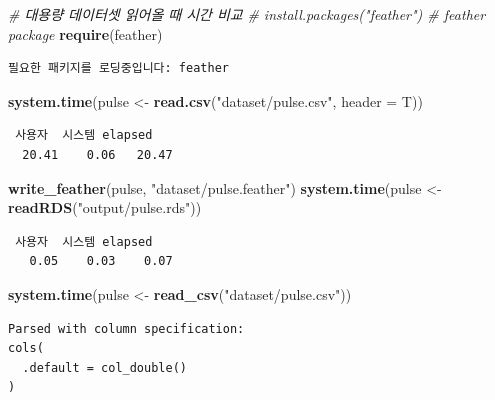 \documentclass[
  11pt,
]{krantz}
\newenvironment{Shaded}{\begin{snugshade}}{\end{snugshade}}
\newcommand{\CommentTok}[1]{\textcolor[rgb]{0.37,0.37,0.37}{\textit{#1}}}
\newcommand{\DataTypeTok}[1]{\textcolor[rgb]{0.27,0.27,0.27}{#1}}
\newcommand{\KeywordTok}[1]{\textcolor[rgb]{0.27,0.27,0.27}{\textbf{#1}}}
\newcommand{\NormalTok}[1]{#1}
\newcommand{\StringTok}[1]{\textcolor[rgb]{0.5,0.5,0.5}{#1}}
\begin{document}
\begin{Shaded}
\begin{Highlighting}[]
\CommentTok{# 대용량 데이터셋 읽어올 때 시간 비교}
\CommentTok{# install.packages("feather") # feather package}
\KeywordTok{require}\NormalTok{(feather)}
\end{Highlighting}
\end{Shaded}

\begin{verbatim}
필요한 패키지를 로딩중입니다: feather
\end{verbatim}

\begin{Shaded}
\begin{Highlighting}[]
\KeywordTok{system.time}\NormalTok{(pulse <-}\StringTok{ }\KeywordTok{read.csv}\NormalTok{(}\StringTok{"dataset/pulse.csv"}\NormalTok{, }\DataTypeTok{header =}\NormalTok{ T))}
\end{Highlighting}
\end{Shaded}

\begin{verbatim}
 사용자  시스템 elapsed 
  20.41    0.06   20.47 
\end{verbatim}

\begin{Shaded}
\begin{Highlighting}[]
\KeywordTok{write_feather}\NormalTok{(pulse, }\StringTok{"dataset/pulse.feather"}\NormalTok{)}
\KeywordTok{system.time}\NormalTok{(pulse <-}\StringTok{ }\KeywordTok{readRDS}\NormalTok{(}\StringTok{"output/pulse.rds"}\NormalTok{))}
\end{Highlighting}
\end{Shaded}

\begin{verbatim}
 사용자  시스템 elapsed 
   0.05    0.03    0.07 
\end{verbatim}

\begin{Shaded}
\begin{Highlighting}[]
\KeywordTok{system.time}\NormalTok{(pulse <-}\StringTok{ }\KeywordTok{read_csv}\NormalTok{(}\StringTok{"dataset/pulse.csv"}\NormalTok{))}
\end{Highlighting}
\end{Shaded}

\begin{verbatim}
Parsed with column specification:
cols(
  .default = col_double()
)
\end{verbatim}
\end{document}
